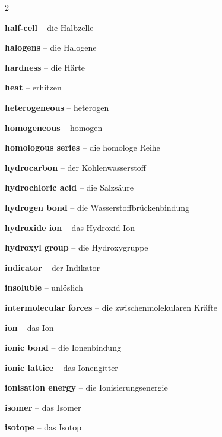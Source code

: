 \begin{multicols}{2}
\par\nopagebreak
\textbf{half-cell} -- die Halbzelle\dotfill\hyperref[e:201]{\pageref*{e:201}}\par
\textbf{halogens} -- die Halogene\dotfill\hyperref[e:90]{\pageref*{e:90}}\par
\textbf{hardness} -- die Härte\dotfill\hyperref[e:23]{\pageref*{e:23}}\par
\textbf{heat} -- erhitzen\dotfill\hyperref[e:65]{\pageref*{e:65}}\par
\textbf{heterogeneous} -- heterogen\dotfill\hyperref[e:7]{\pageref*{e:7}}\par
\textbf{homogeneous} -- homogen\dotfill\hyperref[e:6]{\pageref*{e:6}}\par
\textbf{homologous series} -- die homologe Reihe\dotfill\hyperref[e:213]{\pageref*{e:213}}\par
\textbf{hydrocarbon} -- der Kohlenwasserstoff\dotfill\hyperref[e:209]{\pageref*{e:209}}\par
\textbf{hydrochloric acid} -- die Salzsäure\dotfill\hyperref[e:178]{\pageref*{e:178}}\par
\textbf{hydrogen bond} -- die Wasserstoffbrückenbindung\dotfill\hyperref[e:118]{\pageref*{e:118}}\par
\textbf{hydroxide ion} -- das Hydroxid-Ion\dotfill\hyperref[e:165]{\pageref*{e:165}}\par
\textbf{hydroxyl group} -- die Hydroxygruppe\dotfill\hyperref[e:220]{\pageref*{e:220}}\par

\par\nopagebreak
\textbf{indicator} -- der Indikator\dotfill\hyperref[e:159]{\pageref*{e:159}}\par
\textbf{insoluble} -- unlöslich\dotfill\hyperref[e:12]{\pageref*{e:12}}\par
\textbf{intermolecular forces} -- die zwischenmolekularen Kräfte\dotfill\hyperref[e:119]{\pageref*{e:119}}\par
\textbf{ion} -- das Ion\dotfill\hyperref[e:93]{\pageref*{e:93}}\par
\textbf{ionic bond} -- die Ionenbindung\dotfill\hyperref[e:106]{\pageref*{e:106}}\par
\textbf{ionic lattice} -- das Ionengitter\dotfill\hyperref[e:107]{\pageref*{e:107}}\par
\textbf{ionisation energy} -- die Ionisierungsenergie\dotfill\hyperref[e:99]{\pageref*{e:99}}\par
\textbf{isomer} -- das Isomer\dotfill\hyperref[e:216]{\pageref*{e:216}}\par
\textbf{isotope} -- das Isotop\dotfill\hyperref[e:83]{\pageref*{e:83}}\par


\end{multicols}
